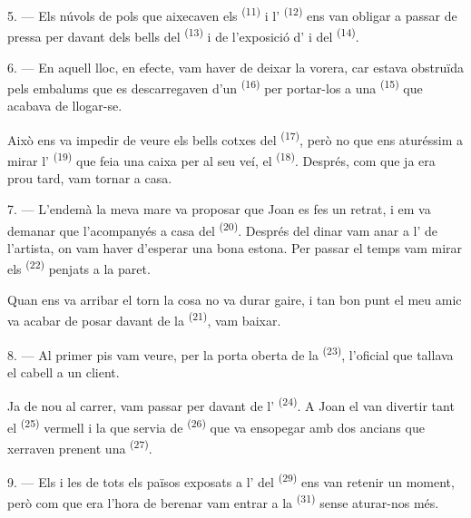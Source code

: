 5. --- Els núvols de pols que aixecaven els 
\textsuperscript{(11)} i l' \textsuperscript{(12)} ens van
obligar a passar de pressa per davant dels bells  del
 \textsuperscript{(13)} i de l'exposició d' i
 del  \textsuperscript{(14)}.

6. --- En aquell lloc, en efecte, vam haver de deixar la vorera, car estava
obstruïda pels embalums que es descarregaven d'un 
\textsuperscript{(16)} per portar-los a una  \textsuperscript{(15)}
que acabava de llogar-se.

Això ens va impedir de veure els bells cotxes del 
\textsuperscript{(17)}, però no que ens aturéssim a mirar l'
\textsuperscript{(19)} que feia una caixa per al seu veí, el  \textsuperscript{(18)}. Després, com que ja era prou tard,
vam tornar a casa.

\VUsaut{3.0mm}

7. --- L'endemà la meva mare va proposar que Joan es fes un retrat, i em va
demanar que l'acompanyés a casa del  \textsuperscript{(20)}.
Després del dinar vam anar a l' de l'artista, on vam haver
d'esperar una bona estona. Per passar el temps vam mirar els 
\textsuperscript{(22)} penjats a la paret.

Quan ens va arribar el torn la cosa no va durar gaire, i tan bon punt el meu amic
va acabar de posar davant de la  \textsuperscript{(21)}, vam baixar.

8. --- Al primer pis vam veure, per la porta oberta de la 
\textsuperscript{(23)}, l'oficial que tallava el cabell a un client.

Ja de nou al carrer, vam passar per davant de l'
\textsuperscript{(24)}. A Joan el van divertir tant el 
\textsuperscript{(25)} vermell i la  que servia de
 \textsuperscript{(26)} que va ensopegar amb dos ancians que
xerraven prenent una  \textsuperscript{(27)}.

\VUsaut{3.0mm}

9. --- Els  i les  de tots els països exposats a
l' del  \textsuperscript{(29)} ens van retenir un
moment, però com que era l'hora de berenar vam entrar a la 
\textsuperscript{(31)} sense aturar-nos més.

